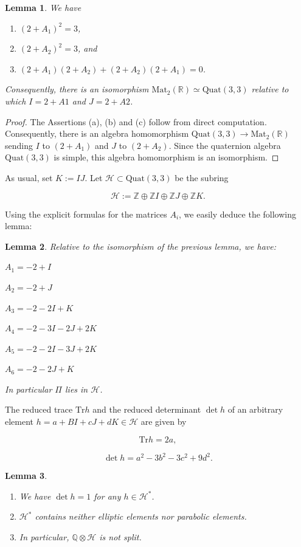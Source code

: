 \documentclass[10pt,a4paper]{amsart}
\newcommand{\Q}{\mathbb{Q}}
\newcommand{\R}{\mathbb{R}}
\newcommand{\Z}{\mathbb{Z}}
\newcommand{\Mat}{\mathrm{Mat}}
\newcommand{\Quat}{{\mathrm {Quat}}}
\newcommand{\Tr}{{\mathrm {Tr}}}
\newtheorem{lemma}{Lemma}
\newcommand{\cH}{\mathcal{H}}
\begin{document}
\begin{lemma}\label{quaternion} We have
\begin{enumerate}
\item[(a)] $(2+A_1)^2=3$,
\item[(b)] $(2+A_2)^2=3$, and
\item[(c)] $(2+A_1)(2+A_2)+(2+A_2)(2+A_1)=0$.
\end{enumerate}
Consequently, there is an isomorphism 
$\Mat_2(\R)\simeq \Quat(3,3)$ relative to which
$I=2+A1$ and $J=2+A2$.
\end{lemma}

\begin{proof} The Assertions (a), (b) and (c) follow from direct computation. Consequently, there is an algebra homomorphism
$\Quat(3,3)\to \Mat_2(\R)$ sending $I$ to $(2+A_1)$ and
$J$ to $(2+A_2)$. Since the quaternion algebra $\Quat(3,3)$ is simple, this algebra homomorphism is an isomorphism.
\end{proof}

As usual, set $K:=IJ$. Let $\cH\subset \Quat(3,3)$ be the subring

$$\cH:=\Z\oplus\Z I\oplus\Z J\oplus \Z K.$$

Using the explicit formulas for the matrices $A_i$, we easily deduce the following lemma:

\begin{lemma} Relative to the isomorphism of the previous lemma, we have:

$A_1=-2+I$

$A_2=-2+J$

$A_3=-2-2I+K$

$A_4=-2-3I-2J+2K$

$A_5=-2-2I-3J+2K$

$A_6=-2-2J+K$

In particular $\Pi$ lies in $\cH$.
\end{lemma}



The reduced  trace $\Tr h$ and the reduced determinant $\det h$ of an arbitrary element  $h=a+BI+cJ+dK\in\cH$ are given by

$$\Tr h= 2a,$$

$$\det h= a^2 -3b^2 -3 c^2 +9d^2.$$






\begin{lemma} \label{H*}

\begin{enumerate}
\item[(a)] We have $\det h=1$  for any $h\in\cH^*$.
\item[(b)] $\cH^*$ contains neither elliptic elements nor
parabolic elements.
\item[(c)] In particular, $\Q\otimes\cH$ is not split.
\end{enumerate}

\end{lemma}
\end{document}
